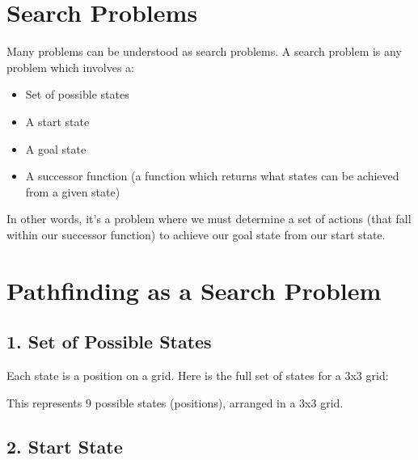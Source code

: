 \documentclass[12pt]{article}
\title{}
\author{Shaan Fulton}
\date{\today}
\begin{document}
\maketitle

\section*{Search Problems}

Many problems can be understood as search problems. A search problem is any problem which involves a:

\begin{itemize}
	\item Set of possible states
	\item A start state
	\item A goal state
	\item A successor function (a function which returns what states can be achieved from a given state)
\end{itemize}

In other words, it's a problem where we must determine a set of actions (that fall within our successor function) to achieve our goal state from our start state.

\section*{Pathfinding as a Search Problem}

\subsection*{1. Set of Possible States}

Each state is a position on a grid. Here is the full set of states for a 3x3 grid:

\begin{center}
\end{center}

This represents 9 possible states (positions), arranged in a 3x3 grid.

\subsection*{2. Start State}
\end{document}
